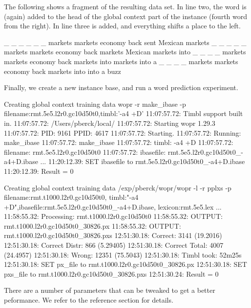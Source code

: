 \documentclass[a4paper,10pt,twoside]{report}
\begin{document}
The following shows a fragment of the resulting data set. In line two,
the word  is (again) added to the head of the global context
part of the instance (fourth word from the right). In line three 
is added, and everything shifts a place to the left.

\begin{wout}{}
_ _ _ _ _ _ markets markets economy back sent Mexican markets
_ _ _ _ _ markets markets economy back markets Mexican markets into
_ _ _ _ markets markets economy back markets into markets into a
_ _ _ _ markets markets economy back markets into into a buzz
\end{wout}

Finally, we create a new instance base, and run a word prediction
experiment.

\begin{bash}{Creating global context training data}
wopr -r make_ibase -p filename:rmt.5e5.l2r0.gc10d50t0,timbl:'-a4 +D'
11:07:57.72: Timbl support built in.
11:07:57.72: /Users/pberck/local/
11:07:57.72: Starting wopr 1.29.3
11:07:57.72: PID:   9161 PPID:   4617
11:07:57.72: Starting.
11:07:57.72: Running: make_ibase
11:07:57.72: make_ibase
11:07:57.72:  timbl:     -a4 +D
11:07:57.72:  filename:  rmt.5e5.l2r0.gc10d50t0
11:07:57.72:  ibasefile: rmt.5e5.l2r0.gc10d50t0_-a4+D.ibase
...
11:20:12.39: SET ibasefile to rmt.5e5.l2r0.gc10d50t0_-a4+D.ibase
11:20:12.39: Result = 0
\end{bash}

\begin{bash}{Creating global context training data}
/exp/pberck/wopr/wopr -l -r pplxs -p filename:rmt.t1000.l2r0.gc10d50t0,
              timbl:"-a4 +D",ibasefile:rmt.5e5.l2r0.gc10d50t0_-a4+D.ibase,
              lexicon:rmt.5e5.lex
...
11:58:55.32: Processing: rmt.t1000.l2r0.gc10d50t0
11:58:55.32: OUTPUT:     rmt.t1000.l2r0.gc10d50t0_30826.px
11:58:55.32: OUTPUT:     rmt.t1000.l2r0.gc10d50t0_30826.pxs
12:51:30.18:  Correct:       3141 (19.2016)
12:51:30.18:  Correct Distr: 866 (5.29405)
12:51:30.18:  Correct Total: 4007 (24.4957)
12:51:30.18:  Wrong:         12351 (75.5043)
12:51:30.18:  Timbl took: 52m25s
12:51:30.18:  SET px_file to rmt.t1000.l2r0.gc10d50t0_30826.px
12:51:30.18:  SET pxs_file to rmt.t1000.l2r0.gc10d50t0_30826.pxs
12:51:30.24: Result = 0
\end{bash}

There are a number of parameters that can be tweaked to get a better
peformance. We refer to the reference section for details.
\end{document}
